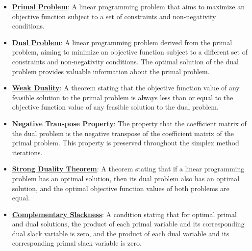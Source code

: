\documentclass{article}%
\begin{document}
\begin{itemize}[leftmargin=*]%
\item \href{https://www.math.purdue.edu/~yipn/421/2024-09-12-Duality.pdf#page=1}{\textbf{Primal Problem}}: A linear programming problem that aims to maximize an objective function subject to a set of constraints and non-negativity conditions.%
\item \href{https://www.math.purdue.edu/~yipn/421/2024-09-12-Duality.pdf#page=1}{\textbf{Dual Problem}}: A linear programming problem derived from the primal problem, aiming to minimize an objective function subject to a different set of constraints and non-negativity conditions. The optimal solution of the dual problem provides valuable information about the primal problem.%
\item \href{https://www.math.purdue.edu/~yipn/421/2024-09-12-Duality.pdf#page=2}{\textbf{Weak Duality}}: A theorem stating that the objective function value of any feasible solution to the primal problem is always less than or equal to the objective function value of any feasible solution to the dual problem.%
\item \href{https://www.math.purdue.edu/~yipn/421/2024-09-12-Duality.pdf#page=6}{\textbf{Negative Transpose Property}}: The property that the coefficient matrix of the dual problem is the negative transpose of the coefficient matrix of the primal problem. This property is preserved throughout the simplex method iterations.%
\item \href{https://www.math.purdue.edu/~yipn/421/2024-09-12-Duality.pdf#page=11}{\textbf{Strong Duality Theorem}}: A theorem stating that if a linear programming problem has an optimal solution, then its dual problem also has an optimal solution, and the optimal objective function values of both problems are equal.%
\item \href{https://www.math.purdue.edu/~yipn/421/2024-09-12-Duality.pdf#page=5}{\textbf{Complementary Slackness}}: A condition stating that for optimal primal and dual solutions, the product of each primal variable and its corresponding dual slack variable is zero, and the product of each dual variable and its corresponding primal slack variable is zero.%
\end{itemize}

%
\end{document}
